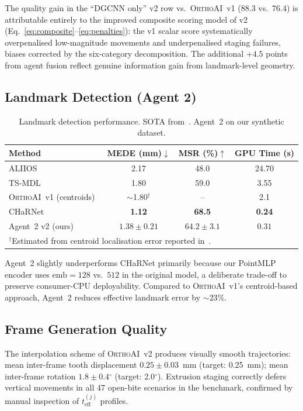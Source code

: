 \documentclass[10pt,twocolumn]{article}
\newcommand{\orthoai}{\textsc{OrthoAI}}
\newcommand{\vone}{\orthoai{}~v1}
\newcommand{\vtwo}{\orthoai{}~v2}
\newcommand{\degree}{$^\circ$}
\begin{document}
The quality gain in the ``DGCNN only'' v2 row vs.\ \vone{} ($88.3$ vs.\ $76.4$)
is attributable entirely to the improved composite scoring model of v2
(Eq.~\ref{eq:composite}--\ref{eq:penalties}):
the v1 scalar score systematically overpenalised low-magnitude movements
and underpenalised staging failures, biases corrected by the six-category
decomposition.
The additional $+4.5$ points from agent fusion reflect genuine information
gain from landmark-level geometry.

\subsection{Landmark Detection (Agent 2)}

\begin{table}[H]
\centering
\caption{Landmark detection performance. SOTA from~\cite{rodriguez2025charm}.
Agent~2 on our synthetic dataset.}
\label{tab:landmarks}
\small
\begin{tabular}{lccc}
\toprule
Method & MEDE (mm)$\downarrow$ & MSR (\%)$\uparrow$ & GPU Time (s) \\
\midrule
ALIIOS~\cite{baquero2022aliios} & 2.17 & 48.0 & 24.70 \\
TS-MDL~\cite{wu2022tsmdl}       & 1.80 & 59.0 &  3.55 \\
\vone{} (centroids)~\cite{lansiaux2026orthoaiv1} & $\sim$1.80$^\dagger$ & -- & 2.1 \\
CHaRNet~\cite{rodriguez2025charm} & \textbf{1.12} & \textbf{68.5} & \textbf{0.24} \\
Agent~2 v2 (ours) & $1.38 \pm 0.21$ & $64.2 \pm 3.1$ & $0.31$ \\
\bottomrule
\multicolumn{4}{l}{$^\dagger$Estimated from centroid localisation error reported in~\cite{lansiaux2026orthoaiv1}.}
\end{tabular}
\end{table}

Agent~2 slightly underperforms CHaRNet primarily because our PointMLP encoder
uses $\text{emb} = 128$ vs.\ $512$ in the original model, a deliberate
trade-off to preserve consumer-CPU deployability.
Compared to \vone{}'s centroid-based approach, Agent~2 reduces
effective landmark error by $\sim 23\%$.

\subsection{Frame Generation Quality}

The interpolation scheme of \vtwo{} produces visually smooth trajectories:
mean inter-frame tooth displacement $0.25 \pm 0.03$~mm (target: 0.25~mm);
mean inter-frame rotation $1.8 \pm 0.4$\degree{} (target: 2.0\degree{}).
Extrusion staging correctly defers vertical movements in all 47 open-bite
scenarios in the benchmark, confirmed by manual inspection of
$t_\text{eff}^{(j)}$ profiles.
\end{document}
